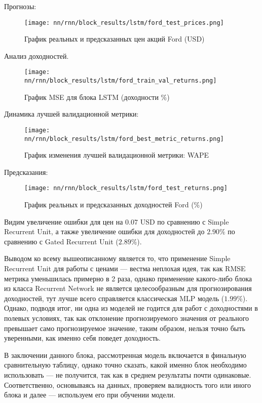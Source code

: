  \noindent Прогнозы:
 \begin{figure}[H]
 	\centering
 	\texttt{[image: nn/rnn/block\_results/lstm/ford\_test\_prices.png]}
 	\caption{График реальных и предсказанных цен акций Ford (USD)}
 	\label{fig::lstm_ford_test_prices}
 \end{figure}
 \noindent Анализ доходностей.
 \begin{figure}[H]
 	\centering
 	\texttt{[image: nn/rnn/block\_results/lstm/ford\_train\_val\_returns.png]}
 	\caption{График MSE для блока LSTM (доходности \%)}
 	\label{fig::lstm_ford_train_val_returns}
 \end{figure}
 \noindent Динамика лучшей валидационной метрики:
 \begin{figure}[H]
 	\centering
 	\texttt{[image: nn/rnn/block\_results/lstm/ford\_best\_metric\_returns.png]}
 	\caption{График изменения лучшей валидационной метрики: WAPE}
 	\label{fig::lstm_ford_best_metric_returns}
 \end{figure}
 \noindent Предсказания:
 \begin{figure}[H]
 	\centering
 	\texttt{[image: nn/rnn/block\_results/lstm/ford\_test\_returns.png]}
 	\caption{График реальных и предсказанных доходностей Ford (\%)}
 	\label{fig::lstm_ford_test_returns}
 \end{figure}
 Видим увеличение ошибки для цен на $0.07$ USD по сравнению с Simple Recurrent Unit, а также увеличение ошибки для доходностей до $2.90\%$ по сравнению с Gated Recurrent Unit ($2.89\%$).
 
 Выводом ко всему вышеописанному является то, что применение Simple Recurrent Unit для работы с ценами --- вестма неплохая идея, так как RMSE метрика уменьшилась примерно в 2 раза, однако применение какого-либо блока из класса Recurrent Network не является целесообразным для прогнозирования доходностей, тут лучше всего справляется классическая MLP модель ($1.99\%$). Однако, подводя итог, ни одна из моделей не годится для работ с доходностями в полевых условиях, так как отклонение прогнозируемого значения от реального превышает само прогнозируемое значение, таким образом, нельзя точно быть уверенными, как именно себя поведет доходность.
 
 В заключении данного блока, рассмотренная модель включается в финальную сравнительную таблицу, однако точно сказать, какой именно блок необходимо использовать --- не получится, так как в среднем результаты почти одинаковые. Соответственно, основываясь на данных, проверяем валидность того или иного блока и далее --- используем его при обучении модели.